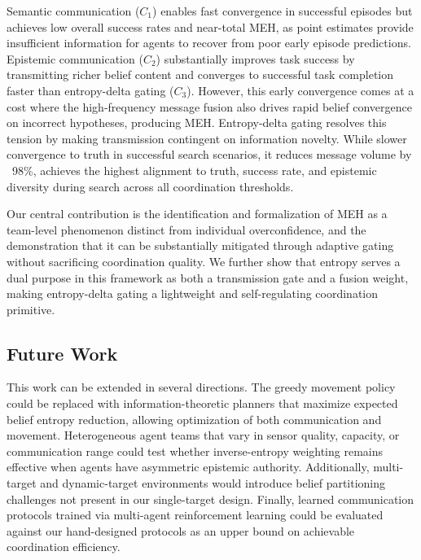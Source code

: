 \documentclass[pdflatex,sn-mathphys-num]{sn-jnl}%
\theoremstyle{thmstyleone}%
\theoremstyle{thmstyletwo}%
\theoremstyle{thmstylethree}%
\begin{document}
Semantic communication ($C_1$) enables fast convergence in successful episodes but achieves low overall success rates and near-total MEH, as point estimates provide insufficient information for agents to recover from poor early episode predictions. Epistemic communication ($C_2$) substantially improves task success by transmitting richer belief content and converges to successful task completion faster than entropy-delta gating ($C_3$). However, this early convergence comes at a cost where the high-frequency message fusion also drives rapid belief convergence on incorrect hypotheses, producing MEH. Entropy-delta gating resolves this tension by making transmission contingent on information novelty. While slower convergence to truth in successful search scenarios, it reduces message volume by ~98\%, achieves the highest alignment to truth, success rate, and epistemic diversity during search across all coordination thresholds.

Our central contribution is the identification and formalization of MEH as a team-level phenomenon distinct from individual overconfidence, and the demonstration that it can be substantially mitigated through adaptive gating without sacrificing coordination quality. We further show that entropy serves a dual purpose in this framework as both a transmission gate and a fusion weight, making entropy-delta gating a lightweight and self-regulating coordination primitive.



\subsection{Future Work}
\label{future}
This work can be extended in several directions. The greedy movement policy could be replaced with information-theoretic planners that maximize expected belief entropy reduction, allowing optimization of both communication and movement. Heterogeneous agent teams that vary in sensor quality, capacity, or communication range could test whether inverse-entropy weighting remains effective when agents have asymmetric epistemic authority. Additionally, multi-target and dynamic-target environments would introduce belief partitioning challenges not present in our single-target design. Finally, learned communication protocols trained via multi-agent reinforcement learning could be evaluated against our hand-designed protocols as an upper bound on achievable coordination efficiency.

\backmatter
\end{document}
